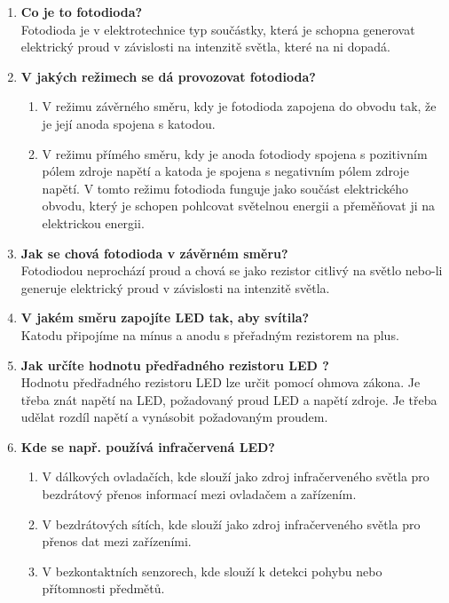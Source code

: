 \documentclass{article}
\begin{document}
\begin{enumerate}
        \item \textbf{Co je to fotodioda?} \\[0.6em] { Fotodioda je v elektrotechnice typ součástky, která je schopna generovat elektrický proud v závislosti na intenzitě světla, které na ni dopadá.}
        \item \textbf{V jakých režimech se dá provozovat fotodioda? } \\ [-1.5em]
        \begin{enumerate}
            \item {V režimu závěrného směru, kdy je fotodioda zapojena do obvodu tak, že je její anoda spojena s katodou.}
            \item {V režimu přímého směru, kdy je anoda fotodiody spojena s pozitivním pólem zdroje napětí a katoda je spojena s negativním pólem zdroje napětí. V tomto režimu fotodioda funguje jako součást elektrického obvodu, který je schopen pohlcovat světelnou energii a přeměňovat ji na elektrickou energii.}
        \end{enumerate}
        \item \textbf{Jak se chová fotodioda v závěrném směru?} \\[0.6em] { Fotodiodou neprochází proud a chová se jako rezistor citlivý na světlo nebo-li generuje elektrický proud v závislosti na intenzitě světla.}
        \item \textbf{V jakém směru zapojíte LED tak, aby svítila?} \\[0.6em] { Katodu připojíme na mínus a anodu s přeřadným rezistorem na plus.}
        \item \textbf{Jak určíte hodnotu předřadného rezistoru LED ?} \\[0.6em] { Hodnotu předřadného rezistoru LED lze určit pomocí ohmova zákona. Je třeba znát napětí na LED, požadovaný proud LED a napětí zdroje. Je třeba udělat rozdíl napětí a vynásobit požadovaným proudem.}
        \vspace{1cm}
        \item \textbf{Kde se např. používá infračervená LED?} \\ [-1.5em]
        \begin{enumerate}
            \item {V dálkových ovladačích, kde slouží jako zdroj infračerveného světla pro bezdrátový přenos informací mezi ovladačem a zařízením.}
            \item {V bezdrátových sítích, kde slouží jako zdroj infračerveného světla pro přenos dat mezi zařízeními.}
            \item {V bezkontaktních senzorech, kde slouží k detekci pohybu nebo přítomnosti předmětů.}

\end{enumerate}
\end{enumerate}
\end{document}
